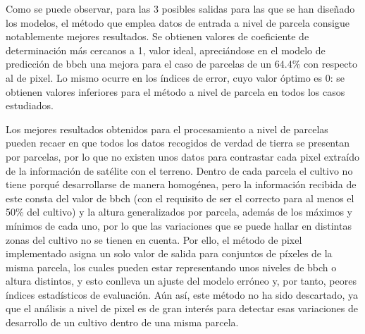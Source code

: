 \par Como se puede observar, para las 3 posibles salidas para las que se han diseñado los modelos, el método que emplea datos de entrada a nivel de parcela consigue notablemente mejores resultados. Se obtienen valores de coeficiente de determinación más cercanos a 1, valor ideal, apreciándose en el modelo de predicción de \gls{bbch} una mejora para el caso de parcelas de un 64.4\% con respecto al de pixel. Lo mismo ocurre en los índices de error, cuyo valor óptimo es 0: se obtienen valores inferiores para el método a nivel de parcela en todos los casos estudiados.
\\
\par Los mejores resultados obtenidos para el procesamiento a nivel de parcelas pueden recaer en que todos los datos recogidos de verdad de tierra se presentan por parcelas, por lo que no existen unos datos para contrastar cada pixel extraído de la información de satélite con el terreno. Dentro de cada parcela el cultivo no tiene porqué desarrollarse de manera homogénea, pero la información recibida de este consta del valor de \gls{bbch} (con el requisito de ser el correcto para al menos el 50\% del cultivo) y la altura generalizados por parcela, además de los máximos y mínimos de cada uno, por lo que las variaciones que se puede hallar en distintas zonas del cultivo no se tienen en cuenta. Por ello, el método de pixel implementado asigna un solo valor de salida para conjuntos de píxeles de la misma parcela, los cuales pueden estar representando unos niveles de \gls{bbch} o altura distintos, y esto conlleva un ajuste del modelo erróneo y, por tanto, peores índices estadísticos de evaluación. Aún así, este método no ha sido descartado, ya que el análisis a nivel de pixel es de gran interés para detectar esas variaciones de desarrollo de un cultivo dentro de una misma parcela. 